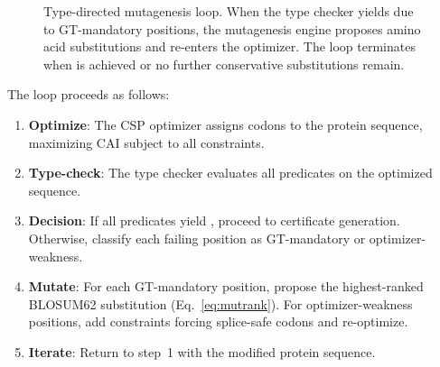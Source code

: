 \begin{figure}[t]
\centering
{}
\caption{Type-directed mutagenesis loop. When the type checker yields
         \FAIL{} due to GT-mandatory positions, the mutagenesis engine
         proposes amino acid substitutions and re-enters the optimizer.
         The loop terminates when \PASS{} is achieved or no further
         conservative substitutions remain.}
\label{fig:mutloop}
\end{figure}

The loop proceeds as follows:
\begin{enumerate}[leftmargin=*,itemsep=0pt,topsep=1pt]
\item \textbf{Optimize}: The CSP optimizer assigns codons to the
      protein sequence, maximizing CAI subject to all constraints.
\item \textbf{Type-check}: The type checker evaluates all predicates on
      the optimized sequence.
\item \textbf{Decision}: If all predicates yield \PASS, proceed to
      certificate generation. Otherwise, classify each failing
      position as GT-mandatory or optimizer-weakness.
\item \textbf{Mutate}: For each GT-mandatory position, propose the
      highest-ranked BLOSUM62 substitution
      (Eq.~\ref{eq:mutrank}).
      For optimizer-weakness positions, add constraints forcing
      splice-safe codons and re-optimize.
\item \textbf{Iterate}: Return to step~1 with the modified protein
      sequence.
\end{enumerate}

